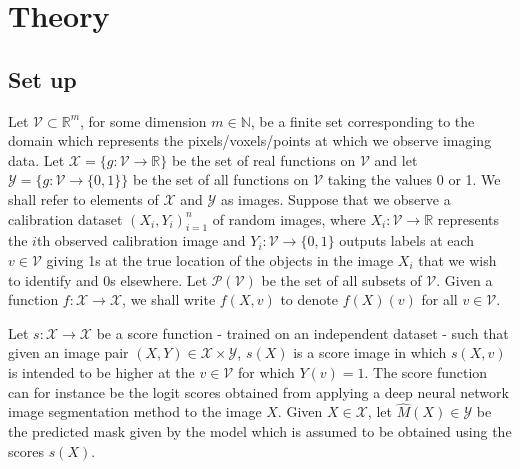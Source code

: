 \section{Theory}
\subsection{Set up}
Let $\mathcal{V} \subset \mathbb{R}^m$, for some dimension $m \in \mathbb{N}$, be a finite set corresponding to the domain which represents the pixels/voxels/points at which we observe imaging data. Let $\mathcal{X} = \lbrace g: \mathcal{V} \rightarrow \mathbb{R}\rbrace$ be the set of real functions on $\mathcal{V}$ and let $\mathcal{Y} = \lbrace g: \mathcal{V} \rightarrow \lbrace 0,1 \rbrace \rbrace$ be the set of all functions on $\mathcal{V}$ taking the values 0 or 1. We shall refer to elements of $\mathcal{X}$ and $\mathcal{Y}$ as images. Suppose that we observe a calibration dataset $(X_i, Y_i)_{i = 1}^n$ of random images, where $X_i: \mathcal{V} \rightarrow \mathbb{R}$ represents the $i$th observed calibration image and $Y_i:\mathcal{V} \rightarrow \lbrace 0, 1\rbrace$ outputs labels at each $v \in \mathcal{V}$ giving 1s at the true location of the objects in the image $X_i$ that we wish to identify and 0s elsewhere. Let $\mathcal{P}(\mathcal{V})$ be the set of all subsets of $\mathcal{V}$. Given a function $f:\mathcal{X} \rightarrow \mathcal{X}$, we shall write $f(X,v)$ to denote $f(X)(v)$ for all $v \in \mathcal{V}$. 

Let $s:\mathcal{X}  \rightarrow \mathcal{X} $ be a score function - trained on an independent dataset - such that given an image pair $(X,Y) \in \mathcal{X}\times \mathcal{Y}$, $s(X)$ is a score image in which $s(X,v) $ is intended to be higher at the $v \in \mathcal{V}$ for which $Y(v) = 1$. The score function can for instance be the logit scores obtained from applying a deep neural network image segmentation method to the image $X$. Given $X \in \mathcal{X}$, let $\hat{M}(X) \in \mathcal{Y}$ be the predicted mask given by the model which is assumed to be obtained using the scores $s(X)$.


